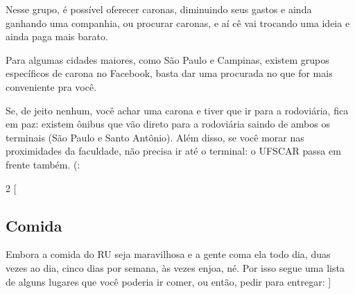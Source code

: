 Nesse grupo, é possível oferecer caronas, diminuindo seus gastos e ainda ganhando uma companhia, ou procurar caronas, e aí cê vai trocando uma ideia e ainda paga mais barato.

Para algumas cidades maiores, como São Paulo e Campinas, existem grupos específicos de carona no Facebook, basta dar uma procurada no que for mais conveniente pra você.

Se, de jeito nenhum, você achar uma carona e tiver que ir para a rodoviária, fica em paz: existem ônibus que vão direto para a rodoviária saindo de ambos os terminais (São Paulo e Santo Antônio). Além disso, se você morar nas proximidades da faculdade, não precisa ir até o terminal: o UFSCAR passa em frente também. (:

\begin{multicols}{2}
  [
  \subsection{Comida}
  Embora a comida do RU seja maravilhosa e a gente coma ela todo dia, duas vezes ao dia, cinco dias por semana, às vezes enjoa, né. Por isso segue uma lista de alguns lugares que você poderia ir comer, ou então, pedir para entregar:
  ]


\end{multicols}

